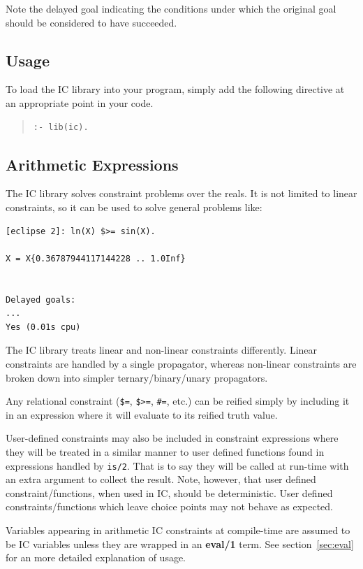 Note the delayed goal indicating the conditions under which the original goal should be considered to have succeeded.


\subsection{Usage}

To load the IC library into your program, simply add the following directive
at an appropriate point in your code.

\begin{quote}
\begin{verbatim}
:- lib(ic).
\end{verbatim}
\end{quote}

\subsection{Arithmetic Expressions}

The IC library solves constraint problems over the reals. It is not
limited to linear constraints, so it can be used to solve general problems
like:
\begin{verbatim}
[eclipse 2]: ln(X) $>= sin(X).

X = X{0.36787944117144228 .. 1.0Inf}


Delayed goals:
...
Yes (0.01s cpu)
\end{verbatim}
The IC library treats linear and non-linear constraints
differently. Linear constraints are handled by a single propagator,
whereas non-linear constraints are broken down into simpler
ternary/binary/unary propagators.

Any relational constraint (\verb|$=|, \verb|$>=|, \verb|#=|, etc.)
can be reified simply by including it in an expression where it will 
evaluate to its reified truth value.

User-defined constraints may also be included in constraint expressions
where they will be treated in a similar manner to user defined
functions found in expressions handled by \verb|is/2|.  That is to say
they will be called at run-time with an extra argument to collect the
result. Note, however, that user defined constraint/functions, when used
in IC, should be deterministic.  User defined constraints/functions which
leave choice points may not behave as expected.

Variables appearing in arithmetic IC constraints at compile-time are
assumed to be IC variables unless they are wrapped in an {\bf eval/1}
term.  See section~\ref{sec:eval} for an more detailed explanation of
usage.


